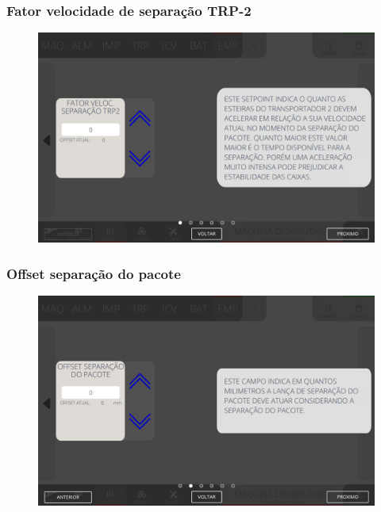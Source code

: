 \newpage
\thispagestyle{fancy}
\vspace*{40 pt}
\subsubsection{\small{Fator velocidade de separação TRP-2}} \label{sec:telaAjustesEmpilhadorFatorVelocidadeSeparacaoTRP2}
\vspace*{\fill}
\begin{figure}[h]
    \centering
    \includegraphics[width=576 px,height=360 px]{src/imagesICV/08-stacker/settings/7.png}
\end{figure}
\vspace*{\fill}

\newpage
\thispagestyle{fancy}
\vspace*{40 pt}
\subsubsection{\small{Offset separação do pacote}} \label{sec:telaAjustesEmpilhadorOffsetSeparacaoPacote}
\vspace*{\fill}
\begin{figure}[h]
    \centering
    \includegraphics[width=576 px,height=360 px]{src/imagesICV/08-stacker/settings/8.png}
\end{figure}
\vspace*{\fill}


